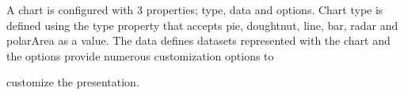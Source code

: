 A chart is configured with 3 properties; type, data and options. Chart type is
 defined using the type property that accepts pie, doughtnut, line, bar, radar and 
 polarArea as a value. The data defines datasets represented with the chart and the options 
 provide numerous customization options to

customize the presentation.